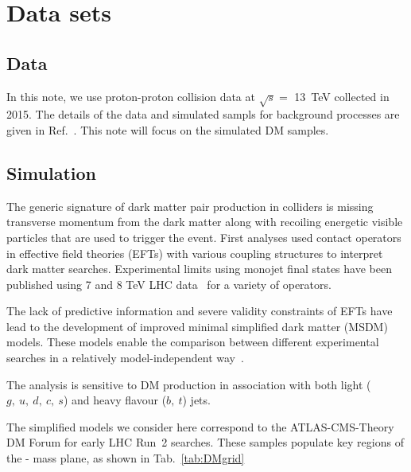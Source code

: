 \section{Data sets}
\label{sec:datasets}

\subsection{Data}


In this note, we use proton-proton collision data at $\sqrt{s} =$ 13~TeV collected in 2015. The details of the data and
simulated sampls for background processes are given in Ref.~\cite{alphaTnote}. This note will focus on the simulated DM samples. 

\subsection{Simulation}


The generic signature of dark matter pair production in colliders is missing
transverse momentum from the dark matter along with recoiling energetic visible
particles that are used to trigger the event. First analyses used contact 
operators~\cite{Goodman:2010ku} in effective field theories (EFTs) with various 
coupling structures to interpret dark matter searches. Experimental limits using
monojet final states have been published using 7 and 8 TeV LHC 
data~\cite{Chatrchyan:2012me,ATLAS:2012ky} for a variety of operators.

The lack of predictive information and severe validity constraints of EFTs have
lead to the development of improved minimal simplified dark matter (MSDM) models.
These models enable the comparison between different experimental
searches in a relatively model-independent way~\cite{Buchmueller:2014yoa}.

The \alphat analysis is sensitive to DM production in association with both
light ($g,~u,~d,~c,~s$) and heavy flavour ($b,~t$) jets. 

The simplified models we consider here correspond to the  ATLAS-CMS-Theory DM Forum 
for early LHC Run~2 searches. These samples populate key regions of the
{\mphi-\mchi} mass plane, as shown in Tab.~\ref{tab:DMgrid}

